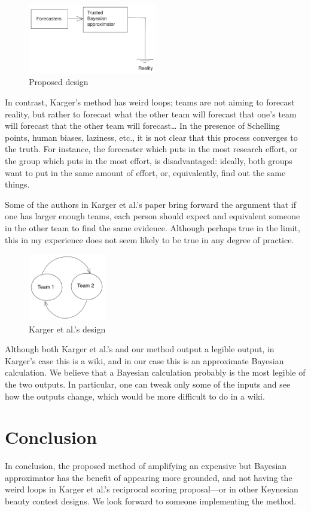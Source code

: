 \documentclass[]{article}
\begin{document}
\begin{figure}
\centering
\includegraphics[width=0.5\textwidth,height=\textheight]{diagrams/amplification-diagram-1.png}
\caption{Proposed design}
\end{figure}

In contrast, Karger's method has weird loops; teams are not aiming to
forecast reality, but rather to forecast what the other team will
forecast that one's team will forecast that the other team will
forecast\ldots{} In the presence of Schelling points, human biases,
laziness, etc., it is not clear that this process converges to the
truth. For instance, the forecaster which puts in the most research
effort, or the group which puts in the most effort, is disadvantaged:
ideally, both groups want to put in the same amount of effort, or,
equivalently, find out the same things.

Some of the authors in Karger et al.'s paper bring forward the argument
that if one has larger enough teams, each person should expect and
equivalent someone in the other team to find the same evidence. Although
perhaps true in the limit, this in my experience does not seem likely to
be true in any degree of practice.

\begin{figure}
\centering
\includegraphics[width=0.3\textwidth,height=\textheight]{diagrams/amplification-diagram-2.png}
\caption{Karger et al.'s design}
\end{figure}

Although both Karger et al.'s and our method output a legible output, in
Karger's case this is a wiki, and in our case this is an approximate
Bayesian calculation. We believe that a Bayesian calculation probably is
the most legible of the two outputs. In particular, one can tweak only
some of the inputs and see how the outputs change, which would be more
difficult to do in a wiki.

\hypertarget{conclusion}{%
\section{Conclusion}\label{conclusion}}

In conclusion, the proposed method of amplifying an expensive but
Bayesian approximator has the benefit of appearing more grounded, and
not having the weird loops in Karger et al.'s reciprocal scoring
proposal---or in other Keynesian beauty contest designs. We look forward
to someone implementing the method.
\end{document}
